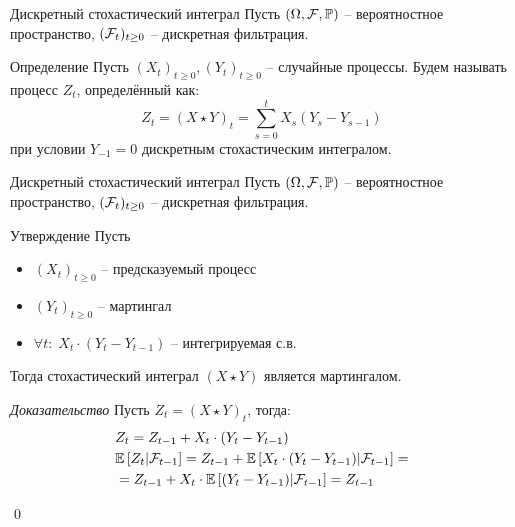 \documentclass{beamer}
\begin{document}
\begin{frame}{Дискретный стохастический интеграл}
    Пусть $(\Omega, \mathcal{F}, \mathbb{P})$ -- вероятностное пространство, $(\mathcal{F}_t)_{t\geq 0}$ -- дискретная фильтрация.
    \begin{block}{Определение}
    Пусть $(X_t)_{t\geq 0}, (Y_t)_{t \geq 0}$ -- случайные процессы. Будем называть процесс $Z_t$, определённый как:
    $$
        Z_t = (X\star Y)_t = \sum_{s=0}^t X_s (Y_s-Y_{s-1})
    $$при условии $Y_{-1} = 0$ дискретным стохастическим интегралом.
    \end{block}
\end{frame}

\begin{frame}{Дискретный стохастический интеграл}
    Пусть $(\Omega, \mathcal{F}, \mathbb{P})$ -- вероятностное пространство, $(\mathcal{F}_t)_{t\geq 0}$ -- дискретная фильтрация.

    \begin{block}{Утверждение}
        Пусть 
        \begin{itemize}
            \item $(X_t)_{t\geq 0}$ -- предсказуемый процесс
            \item $ (Y_t)_{t \geq 0}$ -- мартингал
            \item $\forall t: \; X_t \cdot (Y_t-Y_{t-1})$ -- интегрируемая с.в. 
        \end{itemize}
        Тогда стохастический интеграл $(X\star Y)$ является мартингалом.
    \end{block}

    \textit{Доказательство}
    Пусть $Z_t = (X\star Y)_t$, тогда:
    \begin{align*}
        & Z_{t} = Z_{t-1} + X_t \cdot (Y_t - Y_{t-1}) \\
        & \mathbb{E} \left[ Z_t | \mathcal{F}_{t-1} \right] = Z_{t-1} + 
        \mathbb{E} \left[ X_t \cdot (Y_t - Y_{t-1}) | \mathcal{F}_{t-1} \right]
        = \\& =Z_{t-1} + X_t \cdot \mathbb{E} \left[ (Y_t - Y_{t-1}) | \mathcal{F}_{t-1} \right] = Z_{t-1}
    \end{align*}

    \qed

\end{frame}
\end{document}
